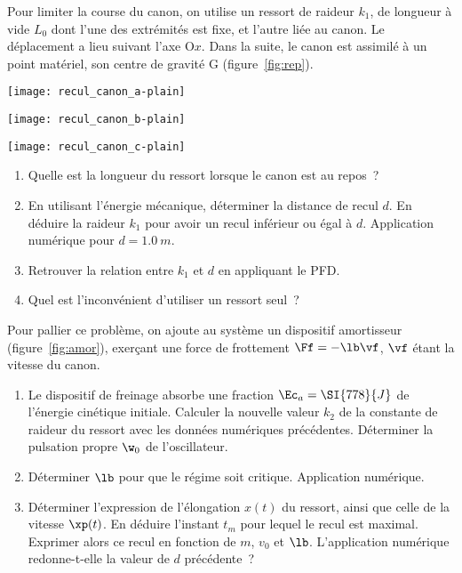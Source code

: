 \documentclass[a4paper, 12pt, final, garamond]{book}
\begin{document}
Pour limiter la course du canon, on utilise un ressort de raideur $k_1$, de
longueur à vide $L_0$ dont l'une des extrémités est fixe, et l'autre liée au
canon. Le déplacement a lieu suivant l'axe O$x$. Dans la suite, le canon est
assimilé à un point matériel, son centre de gravité G (figure~\ref{fig:rep}).

\begin{minipage}{0.40\linewidth}
    \begin{center}
        \texttt{[image: recul\_canon\_a-plain]}
        \label{fig:canon}
    \end{center}
\end{minipage}
\hfill
\begin{minipage}{0.23\linewidth}
    \begin{center}
        \texttt{[image: recul\_canon\_b-plain]}
        \label{fig:rep}
    \end{center}
\end{minipage}
\hfill
\begin{minipage}{0.31\linewidth}
    \begin{center}
        \texttt{[image: recul\_canon\_c-plain]}
        \label{fig:amor}
    \end{center}
\end{minipage} \bigbreak

\begin{enumerate}
    \item Quelle est la longueur du ressort lorsque le canon est au repos~?
    \item En utilisant l'énergie mécanique, déterminer la distance de recul $d$.
        En déduire la raideur $k_1$ pour avoir un recul inférieur ou égal à $d$.
        Application numérique pour $d = \SI{1.0}{m}$.
    \item Retrouver la relation entre $k_1$ et $d$ en appliquant le PFD.
    \item Quel est l'inconvénient d'utiliser un ressort seul~?
\end{enumerate}
Pour pallier ce problème, on ajoute au système un dispositif amortisseur
(figure~\ref{fig:amor}), exerçant une force de frottement $\Ff = -\lb\vf$, $\vf$
étant la vitesse du canon.
\begin{enumerate}[resume]
    \item Le dispositif de freinage absorbe une fraction $\Ec_a = \SI{778}{J}$
        de l'énergie cinétique initiale. Calculer la nouvelle valeur $k_2$ de la
        constante de raideur du ressort avec les données numériques précédentes.
        Déterminer la pulsation propre $\w_0$ de l'oscillateur.
    \item Déterminer $\lb$ pour que le régime soit critique. Application
        numérique.
    \item Déterminer l'expression de l'élongation $x(t)$ du ressort, ainsi que
        celle de la vitesse $\xp(t)$. En déduire l'instant $t_m$ pour lequel le
        recul est maximal. Exprimer alors ce recul en fonction de $m$, $v_0$ et
        $\lb$. L'application numérique redonne-t-elle la valeur de $d$
        précédente~?
\end{enumerate}
\end{document}

